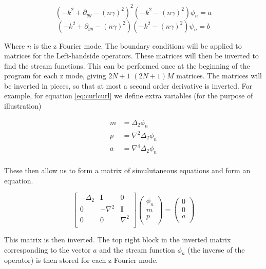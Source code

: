 \documentclass[12pt,a4paper]{article}
\newcommand{\dd}[1]{\partial_{#1}}
\begin{document}
\begin{equation}
    \left( -k^{2} + \dd{yy} -(n\gamma)^{2} \right)^{2}(-k^{2} -(n\gamma)^{2})\phi_{n} = a
\end{equation}
\begin{equation}
    \left( -k^{2} + \dd{yy} -(n\gamma)^{2} \right)(-k^{2} -(n\gamma)^{2})\psi_{n} = b
\end{equation}

Where $n$ is the z Fourier mode. The boundary conditions will be applied to matrices for the Left-handside operators. These matrices will then be inverted to find the stream functions. This can be performed once at the beginning of the program for each z mode, giving $2N+1$ $(2N+1)M$ matrices. The matrices will be inverted in pieces, so that at most a second order derivative is inverted. For example, for equation \ref{eq:curlcurl} we define extra variables (for the purpose of illustration)

\begin{eqnarray}
    m &= \Delta_{2} \phi_{n} \\
    p &= \nabla^{2}\Delta_{2} \phi_{n} \\
    a &= \nabla^{4}\Delta_{2} \phi_{n} \\
\end{eqnarray}

These then allow us to form a matrix of simulutaneous equations and form an equation.

\begin{equation}
    \begin{bmatrix}
    -\Delta_{2} & \mathbf{I}	& 0 \\
    0	        & - \nabla^{2}	& \mathbf{I} \\
    0		& 0		& \nabla^{2} \\
    \end{bmatrix}
    \begin{pmatrix}
    \phi_{n} \\
    m \\
    p \\
    \end{pmatrix}
    = 
    \begin{pmatrix}
    0 \\
    0\\
    a\\
    \end{pmatrix}
\end{equation}

This matrix is then inverted. The top right block in the inverted matrix corresponding to the vector $a$ and the stream function $\phi_{n}$ (the inverse of the operator) is then stored for each z Fourier mode. 
\end{document}
